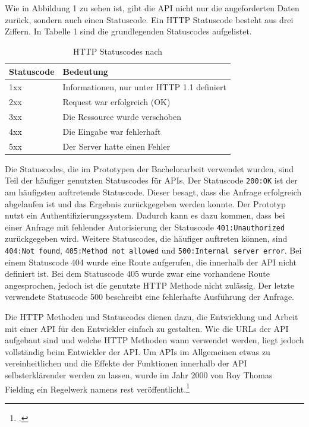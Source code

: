 Wie in Abbildung 1 zu sehen ist, gibt die API nicht nur die angeforderten Daten zurück, sondern auch einen Statuscode. Ein HTTP Statuscode besteht aus drei Ziffern. In Tabelle 1 sind die grundlegenden Statuscodes aufgelistet.

\begin{table}[H]
\centering
\begin{tabular}{l|l}
\textbf{Statuscode} & \textbf{Bedeutung} \\
\hline
1xx & Informationen, nur unter HTTP 1.1 definiert \\
2xx & Request war erfolgreich (OK) \\
3xx & Die Ressource wurde verschoben \\
4xx & Die Eingabe war fehlerhaft \\
5xx & Der Server hatte einen Fehler \\
\end{tabular}
\caption{HTTP Statuscodes nach \cite{doglio2015pro}}
\end{table}

Die Statuscodes, die im Prototypen der Bachelorarbeit verwendet wurden, sind Teil der häufiger genutzten Statuscodes für APIs. Der Statuscode \texttt{200:OK} ist der am häufigsten auftretende Statuscode. Dieser besagt, dass die Anfrage erfolgreich abgelaufen ist und das Ergebnis zurückgegeben werden konnte. Der Prototyp nutzt ein Authentifizierungssystem. Dadurch kann es dazu kommen, dass bei einer Anfrage mit fehlender Autorisierung der Statuscode \texttt{401:Unauthorized} zurückgegeben wird. Weitere Statuscodes, die häufiger auftreten können, sind \texttt{404:Not found}, \texttt{405:Method not allowed} und \texttt{500:Internal server error}. Bei einem Statuscode 404 wurde eine Route aufgerufen, die innerhalb der API nicht definiert ist. Bei dem Statuscode 405 wurde zwar eine vorhandene Route angesprochen, jedoch ist die genutzte HTTP Methode nicht zulässig. Der letzte verwendete Statuscode 500 beschreibt eine fehlerhafte Ausführung der Anfrage. 

Die HTTP Methoden und Statuscodes dienen dazu, die Entwicklung und Arbeit mit einer API für den Entwickler einfach zu gestalten. Wie die URLs der API aufgebaut sind und welche HTTP Methoden wann verwendet werden, liegt jedoch vollständig beim Entwickler der API. Um APIs im Allgemeinen etwas zu vereinheitlichen und die Effekte der Funktionen innerhalb der API selbsterklärender werden zu lassen, wurde im Jahr 2000 von Roy Thomas Fielding ein Regelwerk namens \ac{rest} veröffentlicht.\footcite{masse2011rest}

